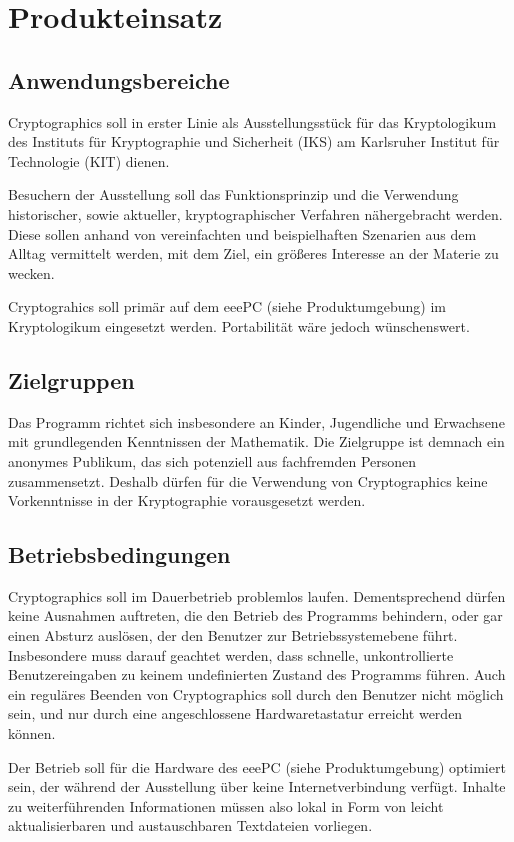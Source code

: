 \documentclass{article}
\begin{document}
\section{Produkteinsatz}
\subsection{Anwendungsbereiche}
Cryptographics soll in erster Linie als Ausstellungsstück für das Kryptologikum des Instituts für Kryptographie und Sicherheit (IKS) am Karlsruher Institut für Technologie (KIT) dienen.

Besuchern der Ausstellung soll das Funktionsprinzip und die Verwendung historischer, sowie aktueller, kryptographischer Verfahren nähergebracht werden. Diese sollen anhand von vereinfachten und beispielhaften Szenarien aus dem Alltag vermittelt werden, mit dem Ziel, ein größeres Interesse an der Materie zu wecken.

Cryptograhics soll primär auf dem eeePC (siehe Produktumgebung) im Kryptologikum eingesetzt werden. Portabilität wäre jedoch wünschenswert.

\subsection{Zielgruppen}

Das Programm richtet sich insbesondere an Kinder, Jugendliche und Erwachsene mit grundlegenden Kenntnissen der Mathematik. Die Zielgruppe ist demnach ein anonymes Publikum, das sich potenziell aus fachfremden Personen zusammensetzt. Deshalb dürfen für die Verwendung von Cryptographics keine Vorkenntnisse in der Kryptographie vorausgesetzt werden.

\subsection{Betriebsbedingungen}

Cryptographics soll im Dauerbetrieb problemlos laufen. Dementsprechend dürfen keine Ausnahmen auftreten, die den Betrieb des Programms behindern, oder gar einen Absturz auslösen, der den Benutzer zur Betriebssystemebene führt. Insbesondere muss darauf geachtet werden, dass schnelle, unkontrollierte Benutzereingaben zu keinem undefinierten Zustand des Programms führen. Auch ein reguläres Beenden von Cryptographics soll durch den Benutzer nicht möglich sein, und nur durch eine angeschlossene Hardwaretastatur erreicht werden können.

Der Betrieb soll für die Hardware des eeePC (siehe Produktumgebung) optimiert sein, der während der Ausstellung über keine Internetverbindung verfügt. Inhalte zu weiterführenden Informationen müssen also lokal in Form von leicht aktualisierbaren und austauschbaren Textdateien vorliegen.
\end{document}
